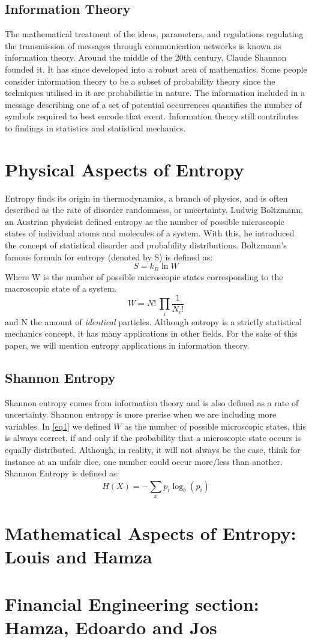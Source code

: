\documentclass[11pt]{article}
\begin{document}
\subsection{Information Theory}
The mathematical treatment of the ideas, parameters, and regulations regulating the transmission of messages through communication networks is known as information theory. Around the middle of the 20th century, Claude Shannon founded it. It has since developed into a robust area of mathematics.
Some people consider information theory to be a subset of probability theory since the techniques utilised in it are probabilistic in nature. The information included in a message describing one of a set of potential occurrences quantifies the number of symbols required to best encode that event. Information theory still contributes to findings in statistics and statistical mechanics.

\section{Physical Aspects of Entropy}
Entropy finds its origin in thermodynamics, a branch of physics, and is often described as the rate of disorder randomness, or uncertainty. Ludwig Boltzmann, an Austrian physicist defined entropy as the number of possible microscopic states of individual atoms and molecules of a system. With this, he introduced the concept of statistical disorder and probability distributions. Boltzmann's famous formula for entropy (denoted by S) is defined as:
\begin{equation*}
    S = k_{B} \ln W
\end{equation*}
Where W is the number of possible microscopic states corresponding to the macroscopic state of a system.
\begin{equation*}
    W = N! \ \prod_{i}^{} \frac{1}{N_{i}!}
\end{equation*}
and N the amount of \textit{identical} particles. Although entropy is a strictly statistical mechanics concept, it has many applications in other fields. For the sake of this paper, we will mention entropy applications in information theory.

\subsection{Shannon Entropy}
Shannon entropy comes from information theory and is also defined as a rate of uncertainty. Shannon entropy is more precise when we are including more variables. In \eqref{eq1} we defined $W$ as the number of possible microscopic states, this is always correct, if and only if the probability that a microscopic state occurs is equally distributed. Although, in reality, it will not always be the case, think for instance at an unfair dice, one number could occur more/less than another. Shannon Entropy is defined as:
\begin{equation*}
H(X) = - \sum_{x}^{} p_{i}\log_b (p_{i})
\end{equation*}

\section{Mathematical Aspects of Entropy: Louis and Hamza}
\section{Financial Engineering section: Hamza, Edoardo and Jos}
\end{document}
